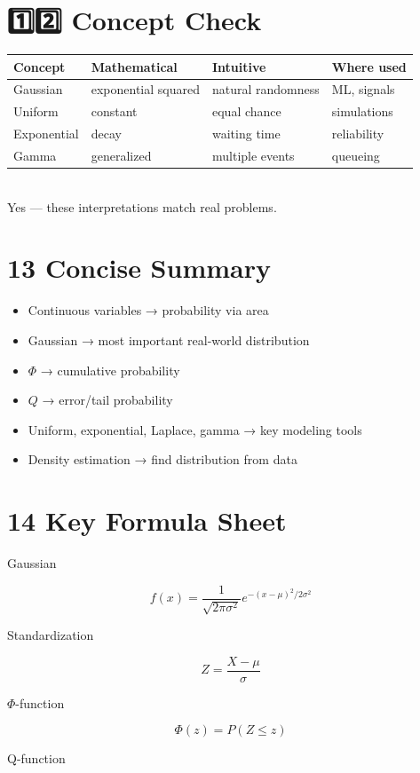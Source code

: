 \documentclass[12pt,a4paper]{article}
\begin{document}
\section*{1️⃣2️⃣ Concept Check}

\begin{tabular}{|l|l|l|l|}
\hline
Concept & Mathematical & Intuitive & Where used\\
\hline
Gaussian & exponential squared & natural randomness & ML, signals\\
Uniform & constant & equal chance & simulations\\
Exponential & decay & waiting time & reliability\\
Gamma & generalized & multiple events & queueing\\
\hline
\end{tabular}
\newline\\
Yes — these interpretations match real problems.

\section*{13 Concise Summary}

\begin{itemize}
\item Continuous variables → probability via area
\item Gaussian → most important real-world distribution
\item $\Phi$ → cumulative probability
\item $Q$ → error/tail probability
\item Uniform, exponential, Laplace, gamma → key modeling tools
\item Density estimation → find distribution from data
\end{itemize}

\section*{14 Key Formula Sheet}

Gaussian

\[
f(x) = \frac{1}{\sqrt{2\pi\sigma^2}} e^{-(x-\mu)^2/2\sigma^2}
\]

Standardization

\[
Z = \frac{X-\mu}{\sigma}
\]

$\Phi$-function

\[
\Phi(z) = P(Z \le z)
\]

Q-function
\end{document}
